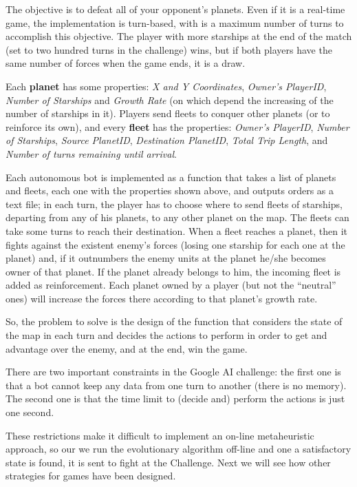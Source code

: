 \documentclass{llncs}
\begin{document}
The objective is to defeat all of your opponent's planets. Even if it
is a real-time game, the implementation is turn-based, with is a
maximum number of turns to accomplish this objective. The player with
more starships at the end of the match (set to two hundred turns in
the challenge) wins, but if both players have
the same number of forces when the game ends, it is a draw. 

Each \textbf{planet} has some properties: \textit{X and Y
  Coordinates}, \textit{Owner's PlayerID}, \textit{Number of
  Starships} and \textit{Growth Rate} (on which depend the increasing
of the number of starships in it). Players send fleets to conquer
other planets (or to reinforce its own), and every \textbf{fleet} has
the properties: 
\textit{Owner's PlayerID}, \textit{Number of Starships},
\textit{Source PlanetID}, \textit{Destination PlanetID}, \textit{Total
  Trip Length}, and \textit{Number of turns remaining until arrival}. 

Each autonomous bot is implemented as a function that takes a list of
planets and  fleets, each one with the properties shown above, and
outputs orders as a text file; in each turn, the player has to choose
where to send fleets of starships, departing from any of his planets,
to any other planet on the map. The fleets can take some turns to
reach their destination. When a fleet reaches a planet, then it fights
against the existent enemy's forces (losing one starship for each one
at the planet) and, if it outnumbers the enemy units at the planet
he/she becomes owner of that planet. If the
planet already belongs to him, the incoming fleet is added as
reinforcement. Each planet owned by a player (but not the ``neutral''
ones) will increase
the forces there according to that planet's growth rate.  

So, the problem to solve is the design of the function that considers
the state of the map in each turn and decides the actions to perform
in order to get and advantage over the enemy, and at the end, win the
game.

There are two important constraints in the Google AI
challenge: the first one is that a bot cannot keep any data from one
turn to another (there is no memory). The second one is that the time
limit to (decide and) perform the actions is just one second.

These restrictions make it difficult to implement an on-line
metaheuristic approach, so our we run the evolutionary algorithm
off-line and one a satisfactory state is found, it is sent to fight at
the Challenge. Next we will see how other strategies for games have
been designed. 
\end{document}

